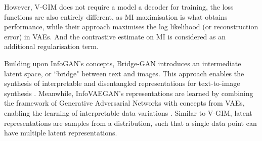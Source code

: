 	However, V-GIM does not require a model a decoder for training, the loss functions are also entirely different, as MI maximisation is what obtains performance, while their approach maximises the log likelihood (or reconstruction error) in VAEs. And the contrastive estimate on MI is considered as an additional regularisation term.
	
	


	
	
	
	Building upon InfoGAN's concepts, Bridge-GAN introduces an intermediate latent space, or ``bridge" between text and images. This approach enables the synthesis of interpretable and disentangled representations for text-to-image synthesis \citep{yuanBridgeGANInterpretableRepresentation2020a}. Meanwhile, InfoVAEGAN's representations are learned by combining the framework of Generative Adversarial Networks with concepts from VAEs, enabling the learning of interpretable data variations \citep{yeInfoVAEGANLearningJoint2021}. Similar to V-GIM, latent representations are samples from a distribution, such that a single data point can have multiple latent representations.
	
	
